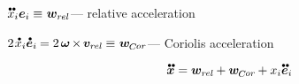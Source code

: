\begin{otherlanguage}{russian}
${
\mathdotdotabove{x}_i \bm{e}_i
\equiv \hspace{.1ex} \bm{w}_{r\kern-0.1exel}
}$\:--- relative acceleration

${
2 \hspace{.2ex} \mathdotabove{x}_i \mathdotabove{\bm{e}}_i \hspace{-0.1ex}
= 2 \hspace{.33ex} \bm{\omega} \hspace{-0.2ex} \times \hspace{-0.2ex} \bm{v}_{r\kern-0.1exel} \hspace{-0.1ex}
\equiv \hspace{.1ex} \bm{w}_{\hspace{-0.1ex}\raisemath{-0.16ex}{C}\hspace{-0.1ex}or}
}$\:--- Coriolis acceleration

\begin{equation*}
\mathdotdotabove{\bm{x}}
= \bm{w}_{r\kern-0.1exel} \hspace{-0.1ex}
+ \bm{w}_{\hspace{-0.1ex}\raisemath{-0.16ex}{C}\hspace{-0.1ex}or} \hspace{-0.1ex}
+ x_i \mathdotdotabove{\bm{e}}_i
\end{equation*}


\end{otherlanguage}
